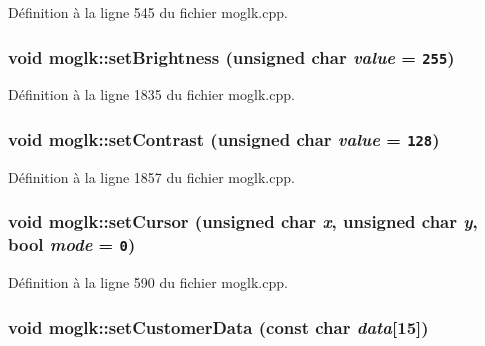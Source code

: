 Définition à la ligne 545 du fichier moglk.cpp.\hypertarget{classmoglk_df864702b2368836b36a3888503e9040}{
\subsubsection[{setBrightness}]{\setlength{\rightskip}{0pt plus 5cm}void moglk::setBrightness (unsigned char {\em value} = {\tt 255})}}
\label{classmoglk_df864702b2368836b36a3888503e9040}




Définition à la ligne 1835 du fichier moglk.cpp.\hypertarget{classmoglk_aef110fe43d65a957b0de17bde3b7436}{
\subsubsection[{setContrast}]{\setlength{\rightskip}{0pt plus 5cm}void moglk::setContrast (unsigned char {\em value} = {\tt 128})}}
\label{classmoglk_aef110fe43d65a957b0de17bde3b7436}




Définition à la ligne 1857 du fichier moglk.cpp.\hypertarget{classmoglk_15e0fbeefcab8874138e8865c53e204c}{
\subsubsection[{setCursor}]{\setlength{\rightskip}{0pt plus 5cm}void moglk::setCursor (unsigned char {\em x}, \/  unsigned char {\em y}, \/  bool {\em mode} = {\tt 0})}}
\label{classmoglk_15e0fbeefcab8874138e8865c53e204c}




Définition à la ligne 590 du fichier moglk.cpp.\hypertarget{classmoglk_fbbdba07a24998b82fa0690a6a4d5f31}{
\subsubsection[{setCustomerData}]{\setlength{\rightskip}{0pt plus 5cm}void moglk::setCustomerData (const char {\em data}\mbox{[}15\mbox{]})}}
\label{classmoglk_fbbdba07a24998b82fa0690a6a4d5f31}




